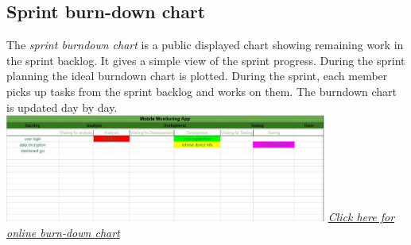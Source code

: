 \documentclass[hidelinks, 12pt, oneside]{article}
\begin{document}
 	\subsection{Sprint burn-down chart}
	The \emph{sprint burndown chart} is a public displayed chart showing remaining work in the sprint backlog. It gives a simple view of the sprint progress. During the sprint planning 
	the ideal burndown chart is plotted. During the sprint, each member picks up tasks from the sprint backlog and works on them. The burndown chart is updated day by day.\newline\newline
	\includegraphics[width=400px]{img/burndown.jpg}\newline
	\href{https://docs.google.com/spreadsheets/u/3/d/1Qa7quxQTuZJmRNlt84Dl4iSXsZh-cYIeFgFJ_hzmv5k/edit?usp=drive_web}{\emph{Click here for online burn-down chart}}\newpage
 	
\end{document}
